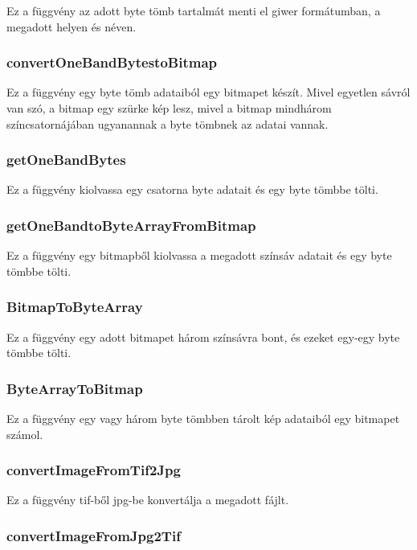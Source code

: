 \documentclass[a4paper,12pt]{article}
\begin{document}
Ez a függvény az adott byte tömb tartalmát menti el giwer formátumban, a megadott helyen és néven.

\subsubsection{convertOneBandBytestoBitmap}

Ez a függvény egy byte tömb adataiból egy bitmapet készít. Mivel egyetlen sávról van szó, a bitmap egy szürke kép lesz, mivel a bitmap mindhárom színcsatornájában ugyanannak a byte tömbnek az adatai vannak.

\subsubsection{getOneBandBytes}

Ez a függvény kiolvassa egy csatorna byte adatait és egy byte tömbbe tölti.

\subsubsection{getOneBandtoByteArrayFromBitmap}

Ez a függvény egy bitmapből kiolvassa a megadott színsáv adatait és egy byte tömbbe tölti.

\subsubsection{BitmapToByteArray}

Ez a függvény egy adott bitmapet három színsávra bont, és ezeket egy-egy byte tömbbe tölti.

\subsubsection{ByteArrayToBitmap}

Ez a függvény egy vagy három byte tömbben tárolt kép adataiból egy bitmapet számol.

\subsubsection{convertImageFromTif2Jpg}

Ez a függvény tif-ből jpg-be konvertálja a megadott fájlt.

\subsubsection{convertImageFromJpg2Tif}
\end{document}
